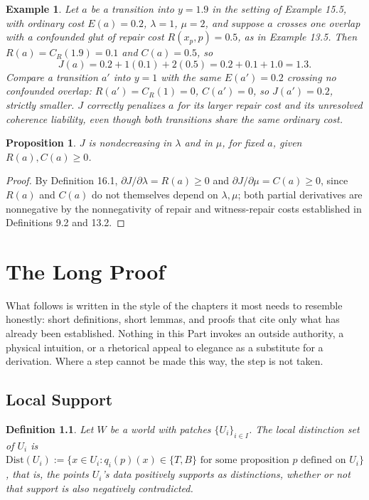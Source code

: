 \documentclass[11pt]{book}
\newtheorem{definition}[theorem]{Definition}
\newtheorem{proposition}[theorem]{Proposition}
\newtheorem{example}[theorem]{Example}
\begin{document}
\begin{example}
Let $a$ be a transition into $y=1.9$ in the setting of Example 15.5, with ordinary cost $E(a)=0.2$, $\lambda=1$, $\mu=2$, and suppose $a$ crosses one overlap with a confounded glut of repair cost $R(x_p,p)=0.5$, as in Example 13.5. Then $R(a) = C_R(1.9) = 0.1$ and $C(a) = 0.5$, so
\[
J(a) = 0.2 + 1(0.1) + 2(0.5) = 0.2+0.1+1.0 = 1.3.
\]
Compare a transition $a'$ into $y=1$ with the same $E(a')=0.2$ crossing no confounded overlap: $R(a')=C_R(1)=0$, $C(a')=0$, so $J(a')=0.2$, strictly smaller. $J$ correctly penalizes $a$ for its larger repair cost and its unresolved coherence liability, even though both transitions share the same ordinary cost.
\end{example}

\begin{proposition}
$J$ is nondecreasing in $\lambda$ and in $\mu$, for fixed $a$, given $R(a),C(a) \geq 0$.
\end{proposition}

\begin{proof}
By Definition 16.1, $\partial J/\partial\lambda = R(a) \geq 0$ and $\partial J/\partial\mu = C(a) \geq 0$, since $R(a)$ and $C(a)$ do not themselves depend on $\lambda,\mu$; both partial derivatives are nonnegative by the nonnegativity of repair and witness-repair costs established in Definitions 9.2 and 13.2.
\end{proof}

\part{The Long Proof}

What follows is written in the style of the chapters it most needs to resemble honestly: short definitions, short lemmas, and proofs that cite only what has already been established. Nothing in this Part invokes an outside authority, a physical intuition, or a rhetorical appeal to elegance as a substitute for a derivation. Where a step cannot be made this way, the step is not taken.

\chapter{Local Support}

\begin{definition}
Let $W$ be a world with patches $\{U_i\}_{i \in I}$. The \emph{local distinction set} of $U_i$ is $\mathrm{Dist}(U_i) := \{ x \in U_i : q_i(p)(x) \in \{T, B\} \text{ for some proposition } p \text{ defined on } U_i \}$, that is, the points $U_i$'s data positively supports as distinctions, whether or not that support is also negatively contradicted.
\end{definition}
\end{document}
